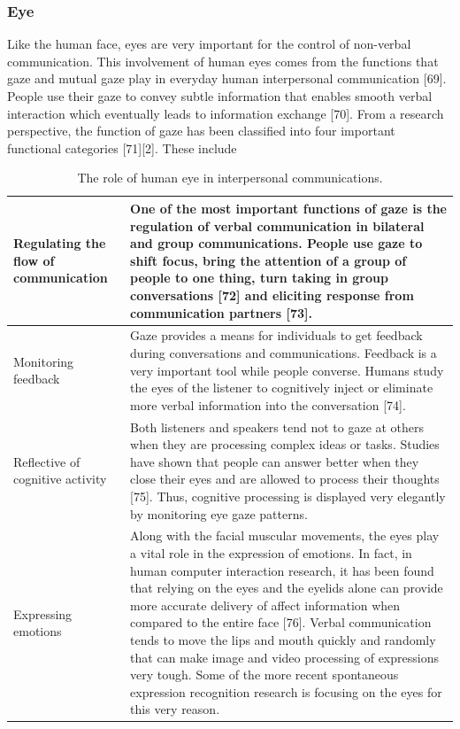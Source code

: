 \documentclass[oneside,11pt]{memoir}
\begin{document}
\subsubsection{Eye}
Like the human face, eyes are very important for the control of non-verbal communication. This involvement of human eyes comes from the functions that gaze and mutual gaze play in everyday human interpersonal communication [69]. People use their gaze to convey subtle information that enables smooth verbal interaction which eventually leads to information exchange [70]. From a research perspective, the function of gaze has been classified into four important functional categories [71][2]. These include

\begin{table}
\begin{center}
\caption{The role of human eye in interpersonal communications.}
\label{Tab:Table4}
\begin{tabularx}{5.5in}{|X|X|}
\hline
Regulating the flow of communication & One of the most important functions of gaze is the regulation of verbal communication in bilateral and group communications. People use gaze to shift focus, bring the attention of a group of people to one thing, turn taking in group conversations [72] and eliciting response from communication partners [73]. \\
\hline
Monitoring feedback & Gaze provides a means for individuals to get feedback during conversations and communications. Feedback is a very important tool while people converse. Humans study the eyes of the listener to cognitively inject or eliminate more verbal information into the conversation [74]. \\
\hline
Reflective of cognitive activity & Both listeners and speakers tend not to gaze at others when they are processing complex ideas or tasks. Studies have shown that people can answer better when they close their eyes and are allowed to process their thoughts [75]. Thus, cognitive processing is displayed very elegantly by monitoring eye gaze patterns. \\
\hline
Expressing emotions & Along with the facial muscular movements, the eyes play a vital role in the expression of emotions. In fact, in human computer interaction research, it has been found that relying on the eyes and the eyelids alone can provide more accurate delivery of affect information when compared to the entire face [76]. Verbal communication tends to move the lips and mouth quickly and randomly that can make image and video processing of expressions very tough. Some of the more recent spontaneous expression recognition research is focusing on the eyes for this very reason. \\
\hline
\end{tabularx}
\end{center}
\end{table}
\end{document}
